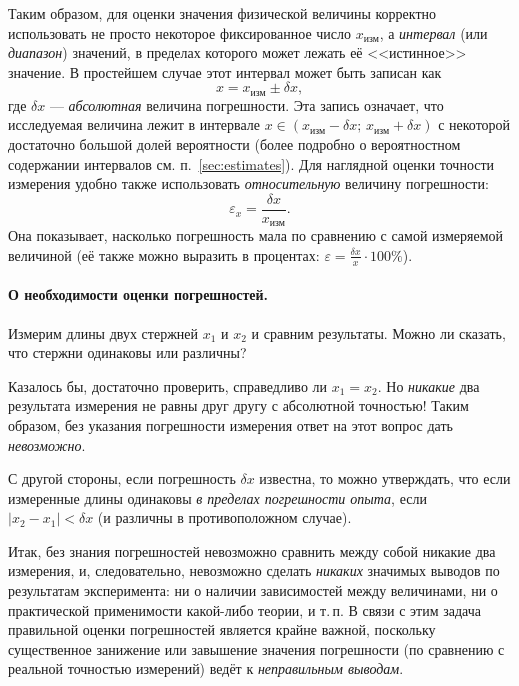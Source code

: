 Таким образом, для оценки значения физической величины корректно использовать
не просто некоторое фиксированное число $x_{\text{изм}}$, а \emph{интервал} (или
\emph{диапазон}) значений, в пределах которого может лежать её
<<истинное>> значение. В простейшем случае этот интервал
может быть записан как
\[
x=x_{\text{изм}}\pm\delta x,
\]
где $\delta x$ --- \emph{абсолютная} величина погрешности.
Эта запись означает, что исследуемая величина лежит в интервале
$x\in(x_{\text{изм}}-\delta x;\,x_{\text{изм}}+\delta x)$
с некоторой достаточно большой долей вероятности (более подробно о
вероятностном содержании интервалов см. п.~\ref{sec:estimates}).
Для наглядной оценки точности измерения удобно также использовать
\emph{относительную} величину погрешности:
\[
\varepsilon_{x}=\frac{\delta x}{x_{\text{изм}}}.
\]
Она показывает, насколько погрешность мала по сравнению с
самой измеряемой величиной (её также можно выразить в процентах:
$\varepsilon=\frac{\delta x}{x}\cdot100\%$).


\paragraph{О необходимости оценки погрешностей.}

Измерим длины двух стержней $x_{1}$ и $x_{2}$ и сравним результаты.
Можно ли сказать, что стержни одинаковы или различны?

Казалось бы,
достаточно проверить, справедливо ли $x_{1}=x_{2}$. Но \emph{никакие}
два результата измерения не равны друг другу с абсолютной точностью! Таким
образом, без указания погрешности измерения ответ на этот вопрос дать
\emph{невозможно}.

С другой стороны, если погрешность $\delta x$ известна, то можно
утверждать, что если измеренные длины одинаковы
\emph{в пределах погрешности опыта}, если $|x_{2}-x_{1}|<\delta x$
(и различны в противоположном случае).

Итак, без знания погрешностей невозможно сравнить между собой никакие
два измерения, и, следовательно, невозможно сделать \emph{никаких}
значимых выводов по результатам эксперимента: ни о наличии зависимостей
между величинами, ни о практической применимости какой-либо теории,
и т.\,п. В связи с этим задача правильной оценки погрешностей является крайне
важной, поскольку существенное занижение или завышение значения погрешности
(по сравнению с реальной точностью измерений) ведёт к \emph{неправильным выводам}.

